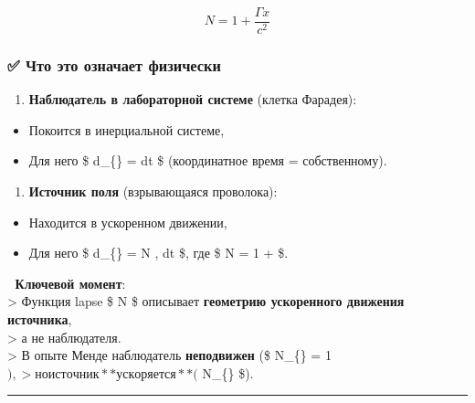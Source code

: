 \documentclass[11pt]{article}
\providecommand{\tightlist}{%
      \setlength{\itemsep}{0pt}\setlength{\parskip}{0pt}}
\begin{document}
\[
N = 1 + \frac{\Gamma x}{c^2}
\]

\subsubsection{✅ Что это означает
физически}\label{ux447ux442ux43e-ux44dux442ux43e-ux43eux437ux43dux430ux447ux430ux435ux442-ux444ux438ux437ux438ux447ux435ux441ux43aux438}

\begin{enumerate}
\def\labelenumi{\arabic{enumi}.}
\tightlist
\item
  \textbf{Наблюдатель в лабораторной системе} (клетка Фарадея):\\
\end{enumerate}

\begin{itemize}
\tightlist
\item
  Покоится в инерциальной системе,\\
\item
  Для него \$ d\tau\_\{\} = dt \$ (координатное время =
  собственному).
\end{itemize}

\begin{enumerate}
\def\labelenumi{\arabic{enumi}.}
\setcounter{enumi}{1}
\tightlist
\item
  \textbf{Источник поля} (взрывающаяся проволока):\\
\end{enumerate}

\begin{itemize}
\tightlist
\item
  Находится в ускоренном движении,\\
\item
  Для него \$ d\tau\_\{\} = N , dt \$, где \$ N = 1 +
   \$.
\end{itemize}

📌 \textbf{Ключевой момент}:\\
\textgreater{} Функция lapse \$ N \$ описывает \textbf{геометрию
ускоренного движения источника},\\
\textgreater{} а не наблюдателя.\\
\textgreater{} В опыте Менде наблюдатель \textbf{неподвижен} (\$
N\_\{\} = 1 \(), > но источник **ускоряется** (\)
N\_\{\}  \$).

\begin{center}\rule{0.5\linewidth}{\linethickness}\end{center}
\end{document}
